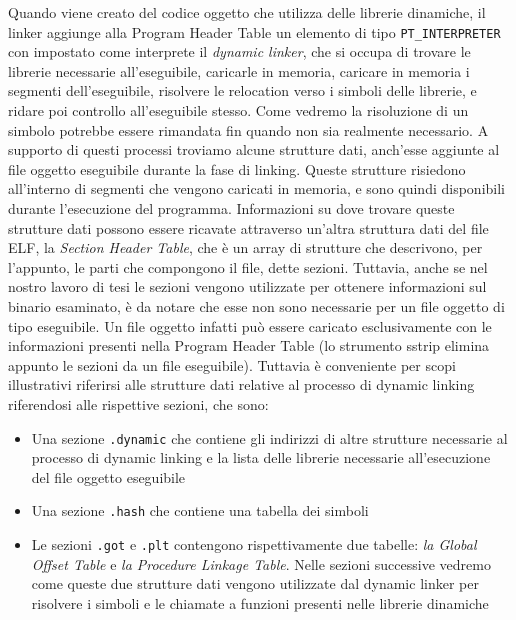 Quando viene creato del codice oggetto che utilizza delle librerie
dinamiche, il linker aggiunge alla Program Header Table un elemento di
tipo \lstinline{PT_INTERPRETER} con impostato come interprete il
\emph{dynamic linker}, che si occupa di trovare le librerie necessarie
all'eseguibile, caricarle in memoria, caricare in memoria i segmenti
dell'eseguibile, risolvere le relocation verso i simboli delle
librerie, e ridare poi controllo all'eseguibile stesso. Come vedremo
la risoluzione di un simbolo potrebbe essere rimandata fin quando non
sia realmente necessario. A supporto di questi processi troviamo
alcune strutture dati, anch'esse aggiunte al file oggetto eseguibile
durante la fase di linking. Queste strutture risiedono all'interno di
segmenti che vengono caricati in memoria, e sono quindi disponibili
durante l'esecuzione del programma. Informazioni su dove trovare
queste strutture dati possono essere ricavate attraverso un'altra
struttura dati del file ELF, la \emph{Section Header Table}, che è un
array di strutture che descrivono, per l'appunto, le parti che
compongono il file, dette sezioni. Tuttavia, anche se nel nostro
lavoro di tesi le sezioni vengono utilizzate per ottenere informazioni
sul binario esaminato, è da notare che esse non sono necessarie per un
file oggetto di tipo eseguibile. Un file oggetto infatti può essere
caricato esclusivamente con le informazioni presenti nella Program
Header Table (lo strumento sstrip\cite{sstrip} elimina appunto le
sezioni da un file eseguibile). Tuttavia è conveniente per scopi
illustrativi riferirsi alle strutture dati relative al processo di
dynamic linking riferendosi alle rispettive sezioni, che sono:

\begin{itemize}

  \item Una sezione \lstinline{.dynamic} che contiene gli indirizzi di
    altre strutture necessarie al processo di dynamic linking e la
    lista delle librerie necessarie all'esecuzione del file oggetto
    eseguibile

  \item Una sezione \lstinline{.hash} che contiene una tabella dei
    simboli

  \item Le sezioni \lstinline{.got} e \lstinline{.plt} contengono
    rispettivamente due tabelle: \emph{la Global Offset Table} e
    \emph{la Procedure Linkage Table}. Nelle sezioni successive
    vedremo come queste due strutture dati vengono utilizzate dal
    dynamic linker per risolvere i simboli e le chiamate a funzioni
    presenti nelle librerie dinamiche

\end{itemize}

